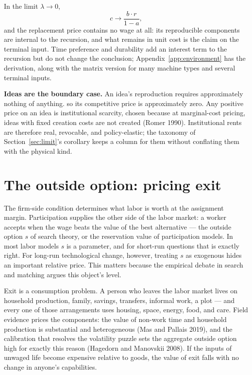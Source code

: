 \documentclass[12pt]{article}
\theoremstyle{plain}
\begin{document}
In the limit $\lambda\to0$,
\begin{equation}\label{eq:lambda-zero}
c \to \frac{b\cdot r}{1-a},
\end{equation}
and the replacement price contains no wage at all: its reproducible components
are internal to the recursion, and what remains in unit cost is the claim on the
terminal input. Time preference and durability add an interest term to the
recursion but do not change the conclusion; Appendix~\ref{app:environment} has
the derivation, along with the matrix version for many machine types and several
terminal inputs.

\textbf{Ideas are the boundary case.} An idea's reproduction requires
approximately nothing of anything. so its competitive price is approximately zero. Any positive
price on an idea is institutional scarcity, chosen because at marginal-cost
pricing, ideas with fixed creation costs are not created (Romer 1990).
Institutional rents are therefore real, revocable, and policy-elastic; the
taxonomy of Section~\ref{sec:limit}'s corollary keeps a column for them
without conflating them with the physical kind.

\section{The outside option: pricing exit}\label{sec:floor}

The firm-side condition determines what labor is worth at the assignment margin.
Participation supplies the other side of the labor market: a worker accepts when
the wage beats the value of the best alternative --- the outside option $s$ of
search theory, or the reservation value of participation models. In most labor
models $s$ is a parameter, and for short-run questions that is exactly right.
For long-run technological change, however, treating $s$ as exogenous hides an important relative price. This matters because the empirical debate in search and matching argues this object's level.

Exit is a consumption problem. A person who leaves the labor market lives on
household production, family, savings, transfers, informal work, a plot --- and
every one of those arrangements uses housing, space, energy, food, and care.
Field evidence prices the components: the value of non-work time and household
production is substantial and heterogeneous (Mas and Pallais 2019), and the
calibration that resolves the volatility puzzle sets the aggregate outside
option high for exactly this reason (Hagedorn and Manovskii 2008). If the inputs
of unwaged life become expensive relative to goods, the value of exit falls with
no change in anyone's capabilities.
\end{document}
